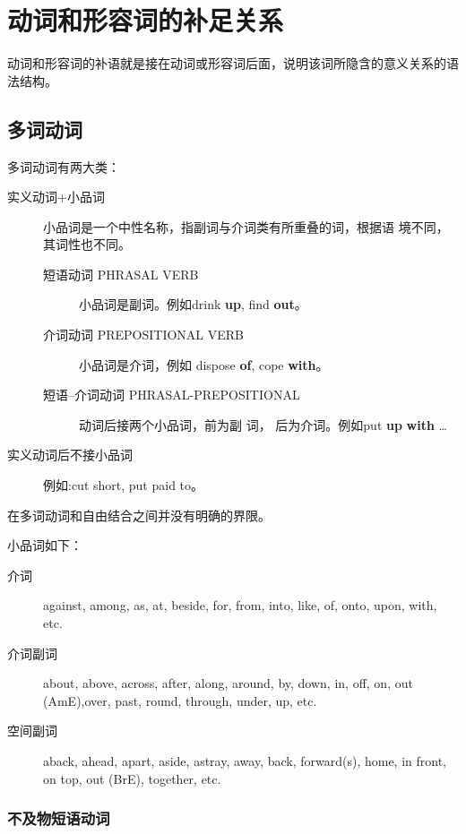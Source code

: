 
\section{动词和形容词的补足关系}

动词和形容词的补语就是接在动词或形容词后面，说明该词所隐含的意义关系的语法结构。

\subsection{多词动词}

多词动词有两大类：
\begin{description}
\item[实义动词+小品词] 小品词是一个中性名称，指副词与介词类有所重叠的词，根据语
  境不同，其词性也不同。
  \begin{description}
  \item[短语动词 PHRASAL VERB] 小品词是副词。例如drink \textbf{up}, find \textbf{out}。

  \item[介词动词 PREPOSITIONAL VERB] 小品词是介词，例如 dispose \textbf{of}, cope \textbf{with}。

  \item[短语--介词动词 PHRASAL-PREPOSITIONAL] 动词后接两个小品词，前为副 词，
    后为介词。例如put \textbf{up} \textbf{with} \ldots{}
  \end{description}

\item[实义动词后不接小品词] 例如:cut short, put paid to。

\end{description}

在多词动词和自由结合之间并没有明确的界限。

小品词如下：
\begin{description}
\item[介词] against, among, as, at, beside, for, from, into, like, of, onto, upon, with, etc.

\item[介词副词] about, above, across, after, along, around, by, down, in, off, on, out (AmE),over, past, round, through, under, up, etc.

\item[空间副词] aback, ahead, apart, aside, astray, away, back, forward(s), home, in front, on top, out (BrE), together, etc.

\end{description}

\subsubsection{不及物短语动词}


